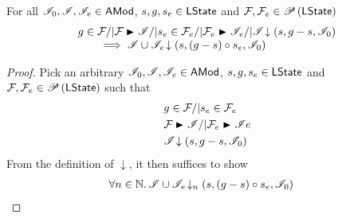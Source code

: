 \begin{lemma}\label{lem:extend-closure-2}
For all $\mathscr{I}_0, \mathscr{I}{}, \mathscr{I}_{e} \in \textsf{AMod}$, $s, g, s_e \in \textsf{LState}$ and $\mathcal{F}_{}, \mathcal{F}_{e} \in \mathscr{P}\left(\textsf{LState} \right)$
%
\[
\begin{array}{l}
	g \in \fence{} /| \fence{} \strictfences \lmod /|
	s_e \in \fence{e} /| \fence{e} \strictfences \lmod_{e} /|
	\extendsAM{\lmod}{s}{g-s}{\lmod_0}\\
	\qquad\implies
	\extendsAM{\lmod \cup \lmod_{e}}{s}{(g-s) \composeL s_e}{\lmod_{0}}
\end{array}
\]
%
\begin{proof} Pick an arbitrary $\mathscr{I}_0, \mathscr{I}, \mathscr{I}_e \in \textsf{AMod}$, $s, g, s_e \in \textsf{LState}$ and $\mathcal{F}_{}, \mathcal{F}_{e} \in \mathscr{P}\left(\textsf{LState} \right)$ such that 
%
\begin{align}
	& g \in \fence{} /| s_e \in \fence{e}  \label{EC2:Ass1}\\
	& \fence{} \strictfences \lmod /| \fence{e} \strictfences \lmod{e} \label{EC2:Ass2}\\
	& \extendsAM{\lmod}{s}{g-s}{\lmod_0} \label{EC2:Ass3}
\end{align} 
%
From the definition of $\downarrow$, it then suffices to show
%
\begin{align}
	& \forall n \in \mathbb{N}.\, \mathscr{I} \cup \mathscr{I}_e \!\downarrow_{n} \left(s, (g-s) \circ s_e, \mathscr{I}_0\right) \label{EC2:Goal2}
\end{align}
%

\end{proof}
\end{lemma}
